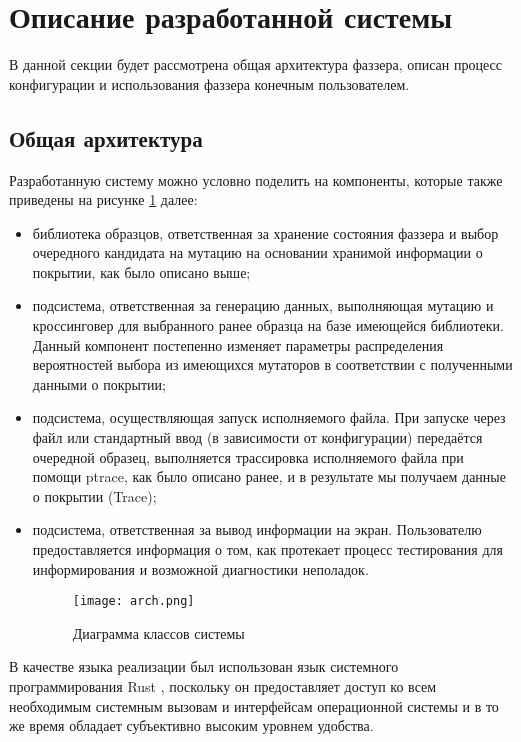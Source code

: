 \section{Описание разработанной системы}

В данной секции будет рассмотрена общая архитектура фаззера, описан процесс конфигурации и использования фаззера конечным пользователем.

\subsection{Общая архитектура}

Разработанную систему можно условно поделить на компоненты, которые также приведены на рисунке \ref{fig:arch} далее:
\begin{itemize}
	\item библиотека образцов, ответственная за хранение состояния фаззера и выбор очередного кандидата на мутацию на основании хранимой информации о покрытии, как было описано выше;
	
	\item подсистема, ответственная за генерацию данных, выполняющая мутацию и кроссинговер для выбранного ранее образца на базе имеющейся библиотеки. Данный компонент постепенно изменяет параметры распределения вероятностей выбора из имеющихся мутаторов в соответствии с полученными данными о покрытии;
	
	\item подсистема, осуществляющая запуск исполняемого файла. При запуске через файл или стандартный ввод (в зависимости от конфигурации) передаётся очередной образец, выполняется трассировка исполняемого файла при помощи ptrace, как было описано ранее, и в результате мы получаем данные о покрытии (Trace);
	
	\item подсистема, ответственная за вывод информации на экран. Пользователю предоставляется информация о том, как протекает процесс тестирования для информирования и возможной диагностики неполадок.

\begin{figure}[h]
	\centering
	\texttt{[image: arch.png]}
	\caption{Диаграмма классов системы}
	\label{fig:arch}
\end{figure}%
	
\end{itemize}

В качестве языка реализации был использован язык системного программирования Rust \cite{rust}, поскольку он предоставляет доступ ко всем необходимым системным вызовам и интерфейсам операционной системы и в то же время обладает субъективно высоким уровнем удобства.

